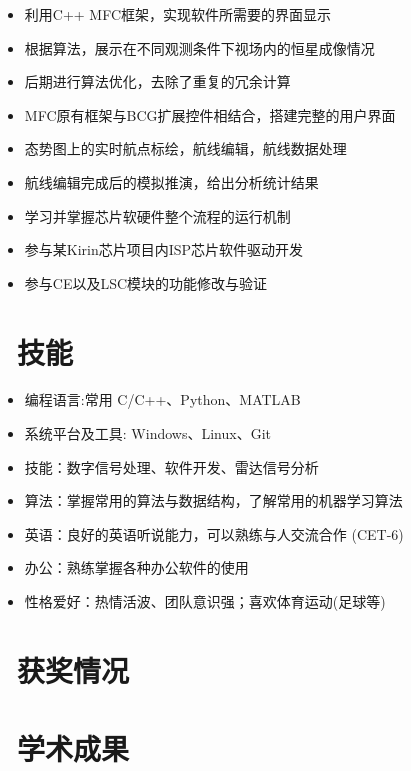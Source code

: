\documentclass{resume}
\begin{document}
\begin{itemize}[topsep = 0 pt, partopsep = 0pt]
  \item 利用C++ MFC框架，实现软件所需要的界面显示
  \item 根据算法，展示在不同观测条件下视场内的恒星成像情况
  \item 后期进行算法优化，去除了重复的冗余计算
\end{itemize}

\begin{itemize}[topsep = 0 pt, partopsep = 0pt]
  \item MFC原有框架与BCG扩展控件相结合，搭建完整的用户界面
  \item 态势图上的实时航点标绘，航线编辑，航线数据处理
  \item 航线编辑完成后的模拟推演，给出分析统计结果
\end{itemize}

\begin{itemize}[topsep = 0 pt, partopsep = 0pt]
  \item 学习并掌握芯片软硬件整个流程的运行机制
  \item 参与某Kirin芯片项目内ISP芯片软件驱动开发
  \item 参与CE以及LSC模块的功能修改与验证
\end{itemize}

\section{\faCogs\ 技能}
\begin{itemize}[parsep=0.5ex]
  \item 编程语言:常用 C/C++、Python、MATLAB  
  \item 系统平台及工具: Windows、Linux、Git
  \item 技能：数字信号处理、软件开发、雷达信号分析
  \item 算法：掌握常用的算法与数据结构，了解常用的机器学习算法
  \item 英语：良好的英语听说能力，可以熟练与人交流合作 (CET-6)
  \item  办公：熟练掌握各种办公软件的使用
  \item  性格爱好：热情活波、团队意识强；喜欢体育运动(足球等)
\end{itemize}

\section{\faHeartO\ 获奖情况}

\section{\faGraduationCap\ 学术成果}
\end{document}
